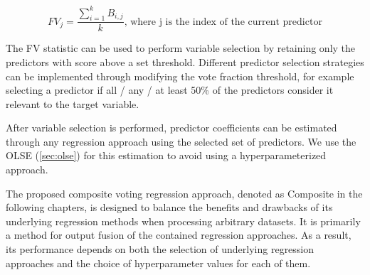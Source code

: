 \begin{equation} \label{eq:frac_votes}
FV_j = \frac{\sum_{i=1}^{k}B_{i,j}}{k}\text{, where j is the index of the current predictor} 
\end{equation}

The FV statistic can be used to perform variable selection by retaining only the predictors with score above a set threshold. Different predictor selection strategies can be implemented through modifying the vote fraction threshold, for example selecting a predictor if all / any / at least 50\% of the predictors consider it relevant to the target variable. 

After variable selection is performed, predictor coefficients can be estimated through any regression approach using the selected set of predictors. We use the OLSE (\ref{sec:olse}) for this estimation to avoid using a hyperparameterized approach. 

The proposed composite voting regression approach, denoted as Composite in the following chapters, is designed to balance the benefits and drawbacks of its underlying regression methods when processing arbitrary datasets. It is primarily a method for output fusion of the contained regression approaches. As a result, its performance depends on both the selection of underlying regression approaches and the choice of hyperparameter values for each of them.
